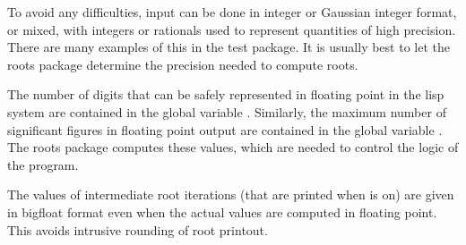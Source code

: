 To avoid any difficulties, input can be done in integer or Gaussian
integer format, or mixed, with integers or rationals used to represent
quantities of high precision. There are many examples of this in the
test package.  It is usually best to let the roots package
determine the precision needed to compute roots.

The number of digits that can be safely represented in floating point in
the lisp system are contained in the global variable .
Similarly, the maximum number of significant figures in floating point
output are contained in the global variable .  The roots
package computes these values, which are needed to control the logic of
the program.  

The values of intermediate root iterations (that are printed when  
is on) are given in bigfloat format even when the actual values
are computed in floating point.  This avoids intrusive rounding of root
printout.

